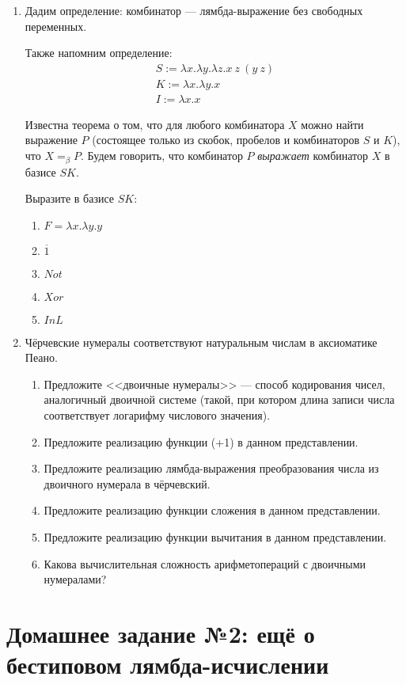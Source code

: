 \documentclass[10pt,a4paper,oneside]{article}
\begin{document}
\begin{enumerate}
\item Дадим определение: комбинатор --- лямбда-выражение без свободных переменных.

Также напомним определение:
$$\begin{array}{l}
S := \lambda x.\lambda y.\lambda z.x\ z\ (y\ z)\\
K := \lambda x.\lambda y.x\\
I := \lambda x.x
\end{array}$$

Известна теорема о том, что для любого комбинатора $X$ можно найти выражение $P$
(состоящее только из скобок, пробелов и комбинаторов $S$ и $K$), что $X =_\beta P$.
Будем говорить, что комбинатор $P$ \emph{выражает} комбинатор $X$ в базисе $SK$.

Выразите в базисе $SK$:
\begin{enumerate}
\item $F = \lambda x.\lambda y.y$
\item $\overline{1}$
\item $Not$
\item $Xor$
\item $InL$
\end{enumerate}

\item Чёрчевские нумералы соответствуют натуральным числам в аксиоматике Пеано.
\begin{enumerate}
\item Предложите <<двоичные нумералы>> --- способ кодирования чисел, аналогичный двоичной системе 
(такой, при котором длина записи числа соответствует логарифму числового значения).
\item Предложите реализацию функции (+1) в данном представлении.
\item Предложите реализацию лямбда-выражения преобразования числа из двоичного нумерала в чёрчевский.
\item Предложите реализацию функции сложения в данном представлении.
\item Предложите реализацию функции вычитания в данном представлении.
\item Какова вычислительная сложность арифметопераций с двоичными нумералами?
\end{enumerate}

\end{enumerate}

\section*{Домашнее задание №2: ещё о бестиповом лямбда-исчислении}
\end{document}
